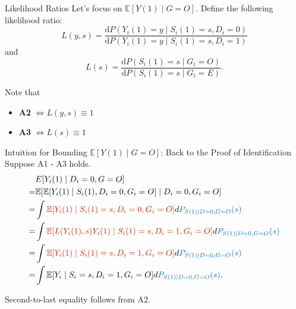 \documentclass{beamer}					%
\newcommand{\Ep}{\mathbb{E}}
\begin{document}
\begin{frame}{Likelihood Ratios}
Let's focus on $\Ep[Y(1) \mid G = O]$. Define the following likelihood ratio:
 $$L(y,s) = \frac{\mathrm{d} P(Y_i(1) = y \mid S_i(1) = s, D_i =0)}{\mathrm{d} P(Y_i(1) = y \mid S_i(1) = s, D_i = 1)}$$ and
$$L(s) = \frac{\mathrm{d} P(S_i(1) = s \mid G_i = O)}{\mathrm{d} P(S_i(1) = s \mid G_i = E)}.$$

Note that \begin{itemize}
    \item {\color{red}\textbf{A2}} $\iff L(y,s) \equiv 1$
    \item {\color{red}\textbf{A3}} $\iff L(s) \equiv 1$
    \end{itemize}
\end{frame}

\begin{frame}{Intuition for Bounding $\Ep[Y(1) \mid G = O]$: Back to the Proof of Identification}
    Suppose A1 - A3 holds. 
    \begin{align*}
       &  E[Y_i(1) \mid D_i = 0, G = O] \\
        = & \mathbb{E}[\mathbb{E}[Y_i(1) \mid S_i(1), D_i = 0, G_i = O] \mid D_i = 0, G_i = O] \\
        = & \int {\color{red}\mathbb{E}[Y_i(1) \mid S_i(1) = s, D_i = 0, G_i = O]}  d {\color{blue}P_{S(1) \mid D = 0, G = O}(s)}\\
        = & \int {\color{red} \Ep[L(Y_i(1),s)Y_i(1) \mid S_i(1) = s, D_i = 1, G_i = O]} d{\color{blue}P_{S(1) \mid D = 0, G = O}(s)} \\
        = &  \int {\color{red}\mathbb{E}[Y_i(1) \mid S_i(1) = s, D_i = 1, G_i = O]} d{\color{blue}P_{S(1) \mid D = 0, G = O}(s)} \\
        = & \int \mathbb{E}[Y_i \mid S_i = s, D_i = 1, G_i = O] d{\color{blue}P_{S(1) \mid D = 0, G = O}(s)}.
        \end{align*}
    
    \centering Second-to-last equality follows from A2.

\end{frame}
\end{document}
